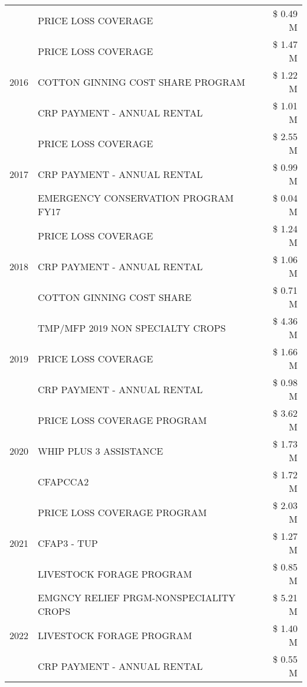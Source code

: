 \begin{tabular}{llr}
 & PRICE LOSS COVERAGE & \$ 0.49 M \\
\cline{1-3}
\multirow[t]{3}{*}{2016} & PRICE LOSS COVERAGE & \$ 1.47 M \\
 & COTTON GINNING COST SHARE PROGRAM & \$ 1.22 M \\
 & CRP PAYMENT - ANNUAL RENTAL & \$ 1.01 M \\
\cline{1-3}
\multirow[t]{3}{*}{2017} & PRICE LOSS COVERAGE & \$ 2.55 M \\
 & CRP PAYMENT - ANNUAL RENTAL & \$ 0.99 M \\
 & EMERGENCY CONSERVATION PROGRAM FY17 & \$ 0.04 M \\
\cline{1-3}
\multirow[t]{3}{*}{2018} & PRICE LOSS COVERAGE & \$ 1.24 M \\
 & CRP PAYMENT - ANNUAL RENTAL & \$ 1.06 M \\
 & COTTON GINNING COST SHARE & \$ 0.71 M \\
\cline{1-3}
\multirow[t]{3}{*}{2019} & TMP/MFP 2019 NON SPECIALTY CROPS & \$ 4.36 M \\
 & PRICE LOSS COVERAGE & \$ 1.66 M \\
 & CRP PAYMENT - ANNUAL RENTAL & \$ 0.98 M \\
\cline{1-3}
\multirow[t]{3}{*}{2020} & PRICE LOSS COVERAGE PROGRAM & \$ 3.62 M \\
 & WHIP PLUS 3 ASSISTANCE & \$ 1.73 M \\
 & CFAPCCA2 & \$ 1.72 M \\
\cline{1-3}
\multirow[t]{3}{*}{2021} & PRICE LOSS COVERAGE PROGRAM & \$ 2.03 M \\
 & CFAP3 - TUP & \$ 1.27 M \\
 & LIVESTOCK FORAGE PROGRAM & \$ 0.85 M \\
\cline{1-3}
\multirow[t]{3}{*}{2022} & EMGNCY RELIEF PRGM-NONSPECIALITY CROPS & \$ 5.21 M \\
 & LIVESTOCK FORAGE PROGRAM & \$ 1.40 M \\
 & CRP PAYMENT - ANNUAL RENTAL & \$ 0.55 M \\
\cline{1-3}
\bottomrule
\end{tabular}
